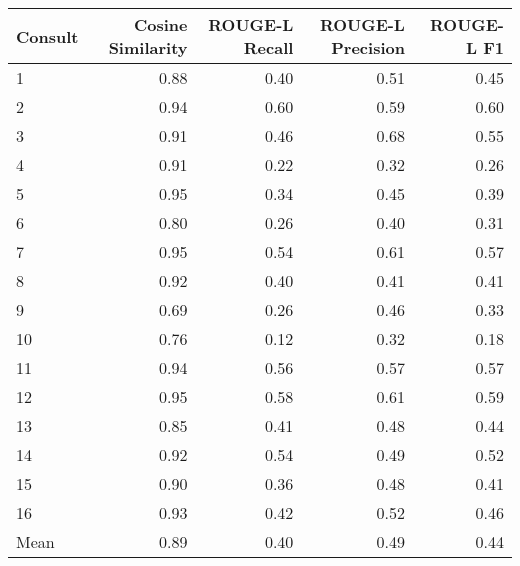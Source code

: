 \begin{tabular}{lrrrr}
\toprule
Consult & Cosine Similarity & ROUGE-L Recall & ROUGE-L Precision & ROUGE-L F1 \\
\midrule
1 & 0.88 & 0.40 & 0.51 & 0.45 \\
2 & 0.94 & 0.60 & 0.59 & 0.60 \\
3 & 0.91 & 0.46 & 0.68 & 0.55 \\
4 & 0.91 & 0.22 & 0.32 & 0.26 \\
5 & 0.95 & 0.34 & 0.45 & 0.39 \\
6 & 0.80 & 0.26 & 0.40 & 0.31 \\
7 & 0.95 & 0.54 & 0.61 & 0.57 \\
8 & 0.92 & 0.40 & 0.41 & 0.41 \\
9 & 0.69 & 0.26 & 0.46 & 0.33 \\
10 & 0.76 & 0.12 & 0.32 & 0.18 \\
11 & 0.94 & 0.56 & 0.57 & 0.57 \\
12 & 0.95 & 0.58 & 0.61 & 0.59 \\
13 & 0.85 & 0.41 & 0.48 & 0.44 \\
14 & 0.92 & 0.54 & 0.49 & 0.52 \\
15 & 0.90 & 0.36 & 0.48 & 0.41 \\
16 & 0.93 & 0.42 & 0.52 & 0.46 \\
Mean & 0.89 & 0.40 & 0.49 & 0.44 \\
\bottomrule
\end{tabular}
